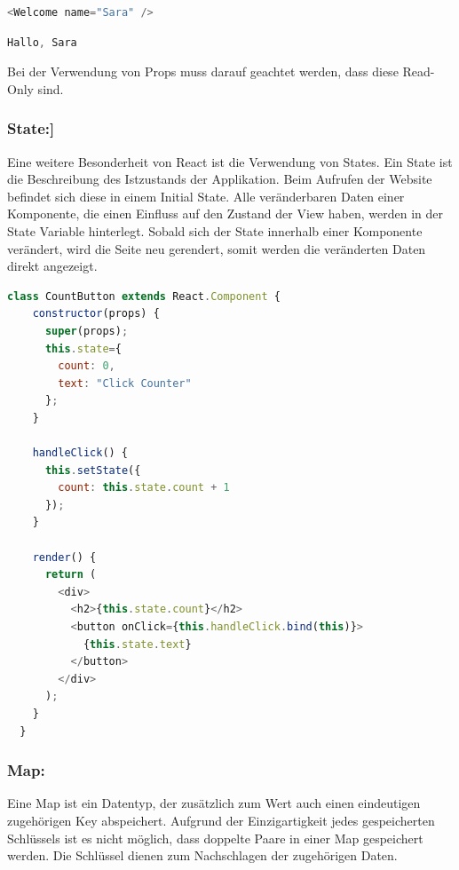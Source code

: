 \begin{lstlisting}[language=JavaScript, caption=Aufruf der Komponente 'Welcome' mit Übergabe des props 'name', label=lst:impl:UebergabeName]
  <Welcome name="Sara" />
\end{lstlisting}\cite{PropsAndComponents}

\begin{lstlisting}[language=JavaScript, caption=Ausgabe der Komponente 'Welcome', label=lst:impl:ausgabeComponentWelcome]
  Hallo, Sara
\end{lstlisting}

Bei der Verwendung von Props muss darauf geachtet werden, dass diese Read-Only sind.
\cite{PropsAndComponents2}

\subsubsection{State:]}
Eine weitere Besonderheit von React ist die Verwendung von States. Ein State ist die Beschreibung des Istzustands der Applikation. Beim Aufrufen der Website befindet sich diese in einem Initial State. Alle veränderbaren Daten einer Komponente, die einen Einfluss auf den Zustand der View haben, werden in der State Variable hinterlegt.
Sobald sich der State innerhalb einer Komponente verändert, wird die Seite neu gerendert, somit werden die veränderten Daten direkt angezeigt.
\cite{T3NReact}

\begin{lstlisting}[language=JavaScript, caption=Beispiel Code eines Click Counters mit der Nutzung on States, label=lst:impl:CountButton]
  class CountButton extends React.Component {
    constructor(props) {
      super(props);
      this.state={
        count: 0,
        text: "Click Counter"
      };
    }

    handleClick() {
      this.setState({
        count: this.state.count + 1
      });
    }

    render() {
      return (
        <div>
          <h2>{this.state.count}</h2>
          <button onClick={this.handleClick.bind(this)}>
            {this.state.text}
          </button>
        </div>
      );
    }
  }
\end{lstlisting} \cite{CountButtonExampleCode}

\newpage

\subsubsection{Map:}
Eine Map ist ein Datentyp, der zusätzlich zum Wert auch einen eindeutigen zugehörigen Key abspeichert. Aufgrund der Einzigartigkeit jedes gespeicherten Schlüssels ist es nicht möglich, dass doppelte Paare in einer Map gespeichert werden. Die Schlüssel dienen zum Nachschlagen der zugehörigen Daten.

